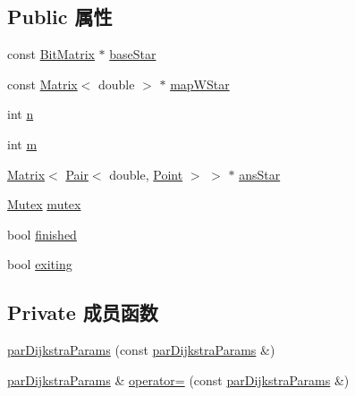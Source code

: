 \subsection*{Public 属性}
\begin{DoxyCompactItemize}
\item 
const \hyperlink{classBitMatrix}{Bit\+Matrix} $\ast$ \hyperlink{structColumnGenSolve_1_1parDijkstraParams_a6d66ec75238960aaf04d2d62058ea077}{base\+Star}
\item 
const \hyperlink{classMatrix}{Matrix}$<$ double $>$ $\ast$ \hyperlink{structColumnGenSolve_1_1parDijkstraParams_ae0b35a1ba11e00c8ce3113b2a174042d}{map\+W\+Star}
\item 
int \hyperlink{structColumnGenSolve_1_1parDijkstraParams_a33cbd8316dde8102d996c01ad2ae68d5}{n}
\item 
int \hyperlink{structColumnGenSolve_1_1parDijkstraParams_a20f153fdd04ede56c8ec19f155e1e423}{m}
\item 
\hyperlink{classMatrix}{Matrix}$<$ \hyperlink{classPair}{Pair}$<$ double, \hyperlink{classPoint}{Point} $>$ $>$ $\ast$ \hyperlink{structColumnGenSolve_1_1parDijkstraParams_a6e3c1462f7a9a1714c190a83819cf632}{ans\+Star}
\item 
\hyperlink{global_8h_a2cdb1fa98da4079d3a6c4ad3e2afe4af}{Mutex} \hyperlink{structColumnGenSolve_1_1parDijkstraParams_afd187d09e520e40b13939295dc60f208}{mutex}
\item 
bool \hyperlink{structColumnGenSolve_1_1parDijkstraParams_a72bfc9f9b0c4851bdb63715b053df511}{finished}
\item 
bool \hyperlink{structColumnGenSolve_1_1parDijkstraParams_a56efc1b9b760d7a8934f06406e2e61a0}{exiting}
\end{DoxyCompactItemize}
\subsection*{Private 成员函数}
\begin{DoxyCompactItemize}
\item 
\hyperlink{structColumnGenSolve_1_1parDijkstraParams_ab5468ca1728c44b12a62df21c563a7a9}{par\+Dijkstra\+Params} (const \hyperlink{structColumnGenSolve_1_1parDijkstraParams}{par\+Dijkstra\+Params} \&)
\item 
\hyperlink{structColumnGenSolve_1_1parDijkstraParams}{par\+Dijkstra\+Params} \& \hyperlink{structColumnGenSolve_1_1parDijkstraParams_a12b23b7cb9fb0678b3a85d0b92cb4c5d}{operator=} (const \hyperlink{structColumnGenSolve_1_1parDijkstraParams}{par\+Dijkstra\+Params} \&)
\end{DoxyCompactItemize}


